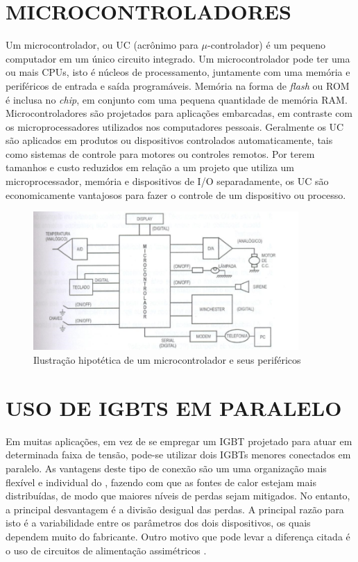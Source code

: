 \section{MICROCONTROLADORES}
\label{sec:micro}

Um microcontrolador, ou UC (acrônimo para   $\mu$-controlador) é um pequeno computador em um único circuito integrado. Um microcontrolador pode ter uma ou mais CPUs, isto é núcleos de processamento, juntamente com uma memória e periféricos de entrada e saída programáveis. Memória na forma de \textit{flash} ou ROM é inclusa no \textit{chip}, em conjunto com uma pequena quantidade de memória RAM. Microcontroladores são projetados para aplicações embarcadas, em contraste com os microprocessadores utilizados nos computadores pessoais. Geralmente os UC são aplicados em produtos ou dispositivos controlados automaticamente, tais como sistemas de controle para motores ou controles remotos. Por terem tamanhos e custo reduzidos em relação a um projeto que utiliza um microprocessador, memória e dispositivos de I/O separadamente, os UC são economicamente vantajosos para fazer o controle de um dispositivo ou processo.


\begin{figure}[!htb]
    \centering
    \includegraphics[width=0.9\textwidth]{./dados/figuras/micro}
    \caption{Ilustração hipotética de um microcontrolador e seus periféricos}
    \label{fig:figura-uc}
\end{figure}

\pagebreak 

\section{USO DE IGBTS EM PARALELO}
\label{sec:paralleligbt}

Em muitas aplicações, em vez de se empregar um IGBT projetado para atuar em determinada faixa de tensão, pode-se utilizar dois IGBTs menores conectados em paralelo. As vantagens deste tipo de conexão são um uma organização mais flexível e individual do , fazendo com que as fontes de calor estejam mais distribuídas, de modo que maiores níveis de perdas sejam mitigados. No entanto, a principal desvantagem é a divisão desigual das perdas. A principal razão para isto é a variabilidade entre os parâmetros dos dois dispositivos, os quais dependem muito do fabricante. Outro motivo que pode levar a diferença citada é o uso de circuitos de alimentação assimétricos \cite{Infineon}.
            
